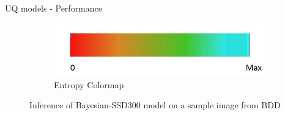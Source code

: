 \documentclass[10pt, aspectratio=169]{beamer}
\begin{document}
\begin{frame}[allowframebreaks]{UQ models - Performance}
\begin{figure}[H]
           \begin{center}
               \begin{subfigure}[t]{0.275\textwidth}
               \includegraphics[width=\textwidth]{images/Slide4.jpg}
               \caption{Entropy Colormap}
           \end{subfigure}
           \end{center}
           \caption{Inference of Bayesian-SSD300 model on a sample image from BDD}
       \end{figure}
    

\end{frame}
\end{document}
